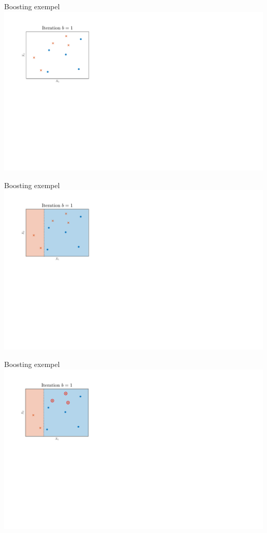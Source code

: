 \documentclass[10pt,english]{beamer}
\begin{document}
\begin{frame}{Boosting exempel}
    \includegraphics[width=\textwidth]{figs/Boosting illustration1.png}
\end{frame}

\begin{frame}{Boosting exempel}
    \includegraphics[width=\textwidth]{figs/Boosting illustration2.png}
\end{frame}

\begin{frame}{Boosting exempel}
    \includegraphics[width=\textwidth]{figs/Boosting illustration3.png}
\end{frame}
\end{document}
